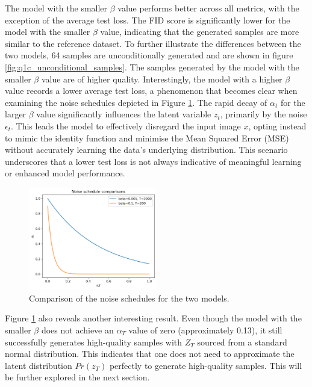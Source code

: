 \documentclass[11pt]{article}
\begin{document}
The model with the smaller $\beta$ value performs better across all metrics, with the exception of the average test loss. The FID score is significantly lower for the model with the smaller $\beta$ value, indicating that the generated samples are more similar to the reference dataset.  To further illustrate the differences between the two models, 64 samples are unconditionally generated and are shown in figure \ref{fig:q1c_unconditional_samples}. The samples generated by the model with the smaller $\beta$ value are of higher quality. Interestingly, the model with a higher $\beta$ value records a lower average test loss, a phenomenon that becomes clear when examining the noise schedules depicted in Figure \ref{fig:q1c_noise_schedules}. The rapid decay of $\alpha_t$ for the larger $\beta$ value significantly influences the latent variable $z_t$, primarily by the noise $\epsilon_t$. This leads the model to effectively disregard the input image $x$, opting instead to mimic the identity function and minimise the Mean Squared Error (MSE) without accurately learning the data's underlying distribution. This scenario underscores that a lower test loss is not always indicative of meaningful learning or enhanced model performance.

\begin{figure}[H]
    \centering
    \includegraphics[width=0.5\textwidth]{figs/q1c_noise_schedule_comparison.png}
    \caption{Comparison of the noise schedules for the two models.}
    \label{fig:q1c_noise_schedules}
\end{figure}
Figure \ref{fig:q1c_noise_schedules} also reveals another interesting result. Even though the model with the smaller $\beta$ does not achieve an $\alpha_T$ value of zero (approximately 0.13), it still successfully generates high-quality samples with $Z_T$ sourced from a standard normal distribution. This indicates that one does not need to approximate the latent distribution $Pr(z_T)$ perfectly to generate high-quality samples. This will be further explored in the next section.
\end{document}

